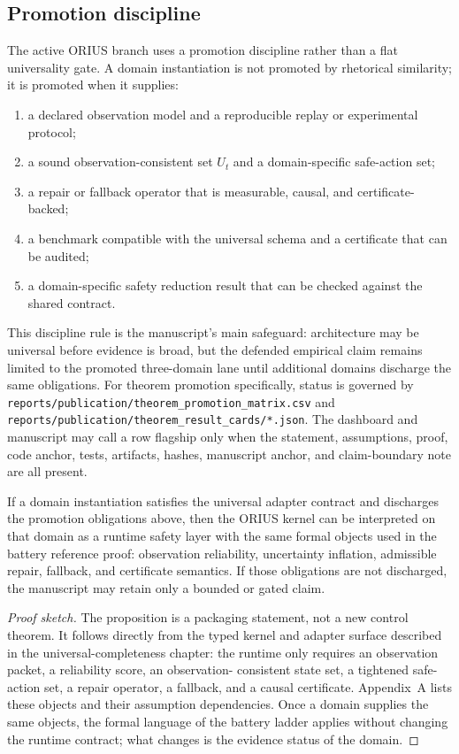 \subsection{Promotion discipline}
The active ORIUS branch uses a promotion discipline rather than a flat universality gate. A
domain instantiation is not promoted by rhetorical similarity; it is promoted when it supplies:
\begin{enumerate}
  \item a declared observation model and a reproducible replay or experimental protocol;
  \item a sound observation-consistent set \(U_t\) and a domain-specific safe-action set;
  \item a repair or fallback operator that is measurable, causal, and certificate-backed;
  \item a benchmark compatible with the universal schema and a certificate that can be audited;
  \item a domain-specific safety reduction result that can be checked against the shared contract.
\end{enumerate}
This discipline rule is the manuscript's main safeguard: architecture may be universal
before evidence is broad, but the defended empirical claim remains limited to the
promoted three-domain lane until additional domains discharge the same obligations.
For theorem promotion specifically, status is governed by
\texttt{reports/publication/theorem\_promotion\_matrix.csv} and
\texttt{reports/publication/theorem\_result\_cards/*.json}.  The dashboard and
manuscript may call a row flagship only when the statement, assumptions, proof,
code anchor, tests, artifacts, hashes, manuscript anchor, and claim-boundary note
are all present.

\begin{proposition}
\label{prop:universality-gate}
If a domain instantiation satisfies the universal adapter contract and discharges the
promotion obligations above, then the ORIUS kernel can be interpreted on that domain as a
runtime safety layer with the same formal objects used in the battery reference proof:
observation reliability, uncertainty inflation, admissible repair, fallback, and
certificate semantics.  If those obligations are not discharged, the manuscript may
retain only a bounded or gated claim.
\end{proposition}

\begin{proof}[Proof sketch]
The proposition is a packaging statement, not a new control theorem.  It follows directly
from the typed kernel and adapter surface described in the universal-completeness chapter:
the runtime only requires an observation packet, a reliability score, an observation-
consistent state set, a tightened safe-action set, a repair operator, a fallback, and a
causal certificate.  Appendix~A lists these objects and their assumption dependencies.
Once a domain supplies the same objects, the formal language of the battery ladder applies
without changing the runtime contract; what changes is the evidence status of the domain.
\end{proof}

